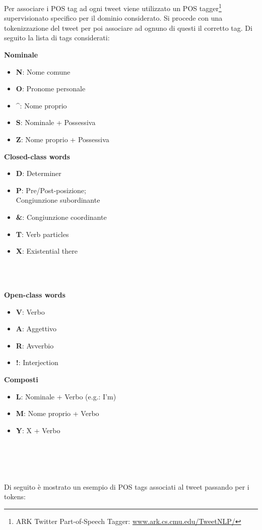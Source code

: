 \documentclass[oneside]{book}
\begin{document}
Per associare i POS tag ad ogni tweet viene utilizzato un POS tagger\footnote{ARK Twitter Part-of-Speech Tagger: \url{www.ark.cs.cmu.edu/TweetNLP/}} supervisionato specifico per il dominio considerato. Si procede con una tokenizzazione del tweet per poi associare ad ognuno di questi il corretto tag. Di seguito la lista di tags considerati:\\


\begin{varwidth}[t]{\textwidth}
	\textbf{Nominale}
	\begin{itemize}
		\item \textbf{N}: Nome comune
		\item \textbf{O}: Pronome personale
		\item \textbf{\^}: Nome proprio
		\item \textbf{S}: Nominale + Possessiva
		\item \textbf{Z}: Nome proprio + Possessiva
	\end{itemize}
\end{varwidth}
\hspace{4em}
\begin{varwidth}[t]{\textwidth}
	\textbf{Closed-class words}
	\begin{itemize}
		\item \textbf{D}: Determiner
		\item \textbf{P}: Pre/Post-posizione;\\Congiunzione subordinante
		\item \textbf{\&}: Congiunzione coordinante
		\item \textbf{T}: Verb particles
		\item \textbf{X}: Existential there
	\end{itemize}
\end{varwidth}\\\\

\begin{varwidth}[t]{\textwidth}
	\textbf{Open-class words}
	\begin{itemize}
		\item \textbf{V}: Verbo
		\item \textbf{A}: Aggettivo
		\item \textbf{R}: Avverbio
		\item \textbf{!}: Interjection
	\end{itemize}
\end{varwidth}
\hspace{11em}
\begin{varwidth}[t]{\textwidth}
	\textbf{Composti}
	\begin{itemize}
		\item \textbf{L}: Nominale + Verbo (e.g.: I'm)
		\item \textbf{M}: Nome proprio + Verbo
		\item \textbf{Y}: X + Verbo
	\end{itemize}
\end{varwidth}\\\\\\\\
Di seguito è mostrato un esempio di POS tags associati al tweet passando per i tokens:
\end{document}
